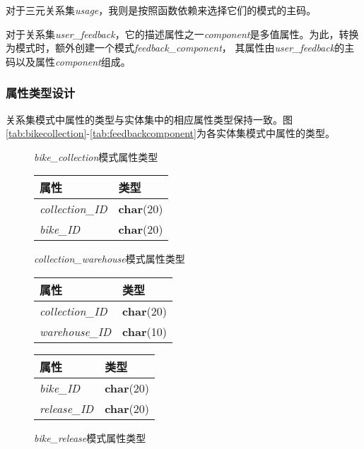   对于三元关系集\textit{usage}，我则是按照函数依赖来选择它们的模式的主码。

  对于关系集\textit{user\_feedback}，它的描述属性之一\textit{component}是多值属性。为此，转换为模式时，额外创建一个模式\textit{feedback\_component}，
  其属性由\textit{user\_feedback}的主码以及属性\textit{component}组成。
\subsubsection{属性类型设计}
关系集模式中属性的类型与实体集中的相应属性类型保持一致。图\ref{tab:bikecollection}-\ref{tab:feedbackcomponent}为各实体集模式中属性的类型。
\begin{figure}[!htp]
    \begin{minipage}{0.3\textwidth}
      \centering
      \caption{\textit{bike\_collection}模式属性类型}
      \label{tab:bikecollection}
      \begin{tabular}{ll}\toprule
        属性&类型\\\midrule
       \textit{collection\_ID}&\textbf{char}(20)\\
       \textit{bike\_ID}&\textbf{char}(20)\\
       \bottomrule
      \end{tabular}
    \end{minipage}\hfill
    \begin{minipage}{0.3\textwidth}
      \centering
      \caption{\textit{collection\_warehouse}模式属性类型}
      \label{tab:collectionwarehouse}
      \begin{tabular}{ll}\toprule
        属性&类型\\\midrule
       \textit{collection\_ID}&\textbf{char}(20)\\
       \textit{warehouse\_ID}&\textbf{char}(10)\\
       \bottomrule
      \end{tabular}
    \end{minipage}\hfill
    \begin{minipage}{0.3\textwidth}
      \centering
      \caption{\textit{bike\_release}模式属性类型}
      \label{tab:bikerelease}
      \begin{tabular}{ll}\toprule
        属性&类型\\\midrule
       \textit{bike\_ID}&\textbf{char}(20)\\
       \textit{release\_ID}&\textbf{char}(20)\\
       \bottomrule
      \end{tabular}
    \end{minipage}\hfill
\end{figure}

